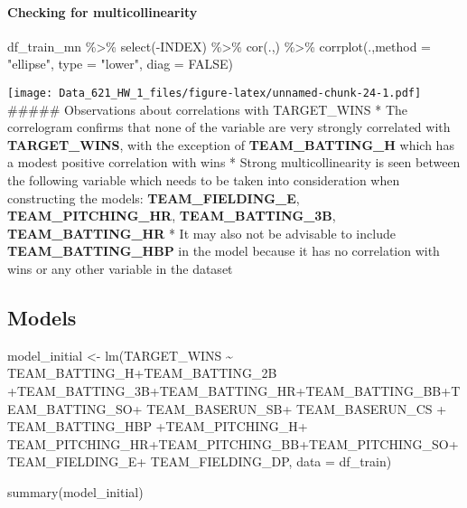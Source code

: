 \documentclass[
]{article}
\newenvironment{Shaded}{\begin{snugshade}}{\end{snugshade}}
\newcommand{\AttributeTok}[1]{\textcolor[rgb]{0.77,0.63,0.00}{#1}}
\newcommand{\ConstantTok}[1]{\textcolor[rgb]{0.00,0.00,0.00}{#1}}
\newcommand{\FunctionTok}[1]{\textcolor[rgb]{0.00,0.00,0.00}{#1}}
\newcommand{\NormalTok}[1]{#1}
\newcommand{\OtherTok}[1]{\textcolor[rgb]{0.56,0.35,0.01}{#1}}
\newcommand{\SpecialCharTok}[1]{\textcolor[rgb]{0.00,0.00,0.00}{#1}}
\newcommand{\StringTok}[1]{\textcolor[rgb]{0.31,0.60,0.02}{#1}}
\begin{document}
\hypertarget{checking-for-multicollinearity}{%
\paragraph{Checking for
multicollinearity}\label{checking-for-multicollinearity}}

\begin{Shaded}
\begin{Highlighting}[]
\NormalTok{df\_train\_mn }\SpecialCharTok{\%\textgreater{}\%} 
 \FunctionTok{select}\NormalTok{(}\SpecialCharTok{{-}}\NormalTok{INDEX) }\SpecialCharTok{\%\textgreater{}\%} 
  \FunctionTok{cor}\NormalTok{(.,) }\SpecialCharTok{\%\textgreater{}\%} 
  \FunctionTok{corrplot}\NormalTok{(.,}\AttributeTok{method =} \StringTok{"ellipse"}\NormalTok{, }\AttributeTok{type =} \StringTok{"lower"}\NormalTok{, }\AttributeTok{diag =} \ConstantTok{FALSE}\NormalTok{)}
\end{Highlighting}
\end{Shaded}

\texttt{[image: Data\_621\_HW\_1\_files/figure-latex/unnamed-chunk-24-1.pdf]}
\#\#\#\#\# Observations about correlations with TARGET\_WINS * The
correlogram confirms that none of the variable are very strongly
correlated with \textbf{TARGET\_WINS}, with the exception of
\textbf{TEAM\_BATTING\_H} which has a modest positive correlation with
wins * Strong multicollinearity is seen between the following variable
which needs to be taken into consideration when constructing the models:
\textbf{TEAM\_FIELDING\_E}, \textbf{TEAM\_PITCHING\_HR},
\textbf{TEAM\_BATTING\_3B}, \textbf{TEAM\_BATTING\_HR} * It may also not
be advisable to include \textbf{TEAM\_BATTING\_HBP} in the model because
it has no correlation with wins or any other variable in the dataset

\hypertarget{models}{%
\subsection{\texorpdfstring{\textbf{Models}}{Models}}\label{models}}

\begin{Shaded}
\begin{Highlighting}[]
\NormalTok{model\_initial }\OtherTok{\textless{}{-}} \FunctionTok{lm}\NormalTok{(TARGET\_WINS }\SpecialCharTok{\textasciitilde{}}\NormalTok{ TEAM\_BATTING\_H}\SpecialCharTok{+}\NormalTok{TEAM\_BATTING\_2B }\SpecialCharTok{+}\NormalTok{TEAM\_BATTING\_3B}\SpecialCharTok{+}\NormalTok{TEAM\_BATTING\_HR}\SpecialCharTok{+}\NormalTok{TEAM\_BATTING\_BB}\SpecialCharTok{+}\NormalTok{TEAM\_BATTING\_SO}\SpecialCharTok{+}
\NormalTok{TEAM\_BASERUN\_SB}\SpecialCharTok{+}\NormalTok{ TEAM\_BASERUN\_CS }\SpecialCharTok{+}\NormalTok{ TEAM\_BATTING\_HBP }\SpecialCharTok{+}\NormalTok{TEAM\_PITCHING\_H}\SpecialCharTok{+}\NormalTok{ TEAM\_PITCHING\_HR}\SpecialCharTok{+}\NormalTok{TEAM\_PITCHING\_BB}\SpecialCharTok{+}\NormalTok{TEAM\_PITCHING\_SO}\SpecialCharTok{+}\NormalTok{TEAM\_FIELDING\_E}\SpecialCharTok{+}\NormalTok{ TEAM\_FIELDING\_DP, }\AttributeTok{data =}\NormalTok{ df\_train)}

\FunctionTok{summary}\NormalTok{(model\_initial)}
\end{Highlighting}
\end{Shaded}
\end{document}
